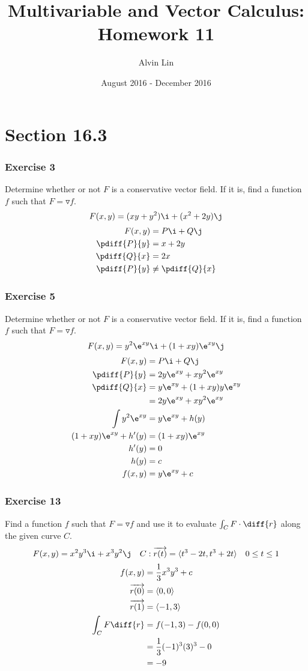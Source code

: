 \documentclass{math}
\title{Multivariable and Vector Calculus: Homework 11}
\author{Alvin Lin}
\date{August 2016 - December 2016}
\begin{document}
\maketitle

\section*{Section 16.3}

\subsubsection*{Exercise 3}
Determine whether or not \( F \) is a conservative vector field. If it is, find
a function \( f \) such that \( F = \triangledown f \).
\[ F(x,y) = (xy+y^2)\i+(x^2+2y)\j \]
\begin{align*}
  F(x,y) &= P\i+Q\j \\
  \pdiff{P}{y} &= x+2y \\
  \pdiff{Q}{x} &= 2x \\
  \pdiff{P}{y} &\ne \pdiff{Q}{x}
\end{align*}

\subsubsection*{Exercise 5}
Determine whether or not \( F \) is a conservative vector field. If it is, find
a function \( f \) such that \( F = \triangledown f \).
\[ F(x,y) = y^2\e^{xy}\i+(1+xy)\e^{xy}\j \]
\begin{align*}
  F(x,y) &= P\i+Q\j \\
  \pdiff{P}{y} &= 2y\e^{xy}+xy^2\e^{xy} \\
  \pdiff{Q}{x} &= y\e^{xy}+(1+xy)y\e^{xy} \\
  &= 2y\e^{xy}+xy^2\e^{xy} \\
  \int y^2\e^{xy} &= y\e^{xy}+h(y) \\
  (1+xy)\e^{xy}+h'(y) &= (1+xy)\e^{xy} \\
  h'(y) &= 0 \\
  h(y) &= c \\
  f(x,y) &= y\e^{xy}+c
\end{align*}

\subsubsection*{Exercise 13}
Find a function \( f \) such that \( F = \triangledown f \) and use it to
evaluate \( \int_{C}F\cdot\diff{r} \) along the given curve \( C \).
\[ F(x,y) = x^2y^3\i+x^3y^2\j \quad
  C:\overrightarrow{r(t)} = \langle t^3-2t,t^3+2t\rangle \quad 0\le t\le1 \]
\begin{align*}
  f(x,y) &= \frac{1}{3}x^3y^3+c \\
  \overrightarrow{r(0)} &= \langle0,0\rangle \\
  \overrightarrow{r(1)} &= \langle-1,3\rangle \\
  \int_{C}F\diff{r} &= f(-1,3)-f(0,0) \\
  &= \frac{1}{3}(-1)^3(3)^3-0 \\
  &= -9
\end{align*}
\end{document}
